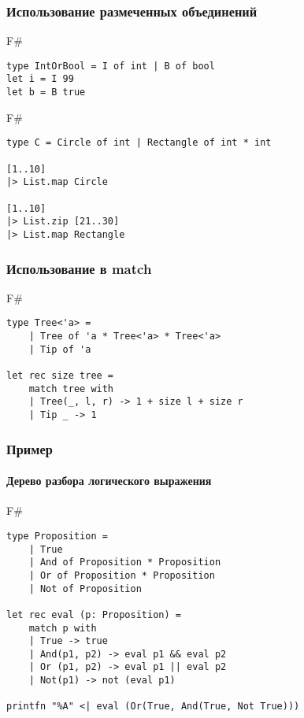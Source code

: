 \documentclass[xetex,mathserif,serif]{beamer}
\begin{document}
	\begin{frame}[fragile]
		\frametitle{Использование размеченных объединений}
		\begin{exampleblock}{F\#}
			\begin{lstlisting}
type IntOrBool = I of int | B of bool
let i = I 99
let b = B true
\end{lstlisting}
\end{exampleblock}
		
		\begin{exampleblock}{F\#}
			\begin{lstlisting}
type C = Circle of int | Rectangle of int * int

[1..10]
|> List.map Circle

[1..10]
|> List.zip [21..30]
|> List.map Rectangle
\end{lstlisting}
\end{exampleblock}
		
\end{frame}

	\begin{frame}[fragile]
		\frametitle{Использование в match}
		\begin{exampleblock}{F\#}
			\begin{lstlisting}
type Tree<'a> =
    | Tree of 'a * Tree<'a> * Tree<'a>
    | Tip of 'a

let rec size tree =
    match tree with
    | Tree(_, l, r) -> 1 + size l + size r
    | Tip _ -> 1
\end{lstlisting}
\end{exampleblock}
		
\end{frame}

	\begin{frame}[fragile]
		\frametitle{Пример}
		\framesubtitle{Дерево разбора логического выражения}
		\begin{exampleblock}{F\#}
			\begin{lstlisting}
type Proposition =
    | True
    | And of Proposition * Proposition
    | Or of Proposition * Proposition
    | Not of Proposition

let rec eval (p: Proposition) =
    match p with
    | True -> true
    | And(p1, p2) -> eval p1 && eval p2
    | Or (p1, p2) -> eval p1 || eval p2
    | Not(p1) -> not (eval p1)

printfn "%A" <| eval (Or(True, And(True, Not True)))
\end{lstlisting}
\end{exampleblock}
		
\end{frame}
\end{document}
